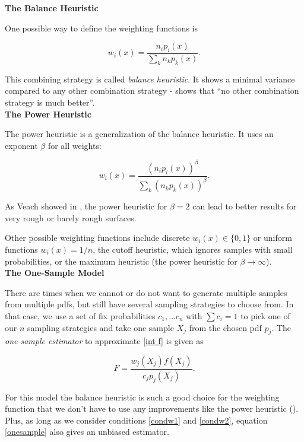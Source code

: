 \textbf{The Balance Heuristic}

One possible way to define the weighting functions is

\begin{equation}
w_i(x) = \frac{n_ip_i(x)}{\sum_k n_kp_k(x)}.
\end{equation}

This combining strategy is called \emph{balance heuristic}. It shows a minimal variance compared to any other combination strategy -  \cite[9.2.2, page 264]{veachdiss} shows that ``no other combination strategy is much better''.\\


\textbf{The Power Heuristic}

The power heuristic is a generalization of the balance heuristic. It uses an exponent $\beta$ for all weights:

\begin{equation}
\label{power heuristic}
w_i(x) = \frac{(n_ip_i(x))^\beta}{\sum_k (n_kp_k(x))^\beta}.
\end{equation}

As Veach showed in \cite[chapter 9.3.1]{veachdiss}, the power heuristic for $\beta=2$ can lead to better results for very rough or barely rough surfaces.

Other possible weighting functions include discrete $w_i(x) \in \{0,1\}$ or uniform functions $w_i(x) = 1/n$, the cutoff heuristic, which ignores samples with small probabilities, or the maximum heuristic (the power heuristic for $\beta \rightarrow \infty$).\\

\textbf{The One-Sample Model}

There are times when we cannot or do not want to generate multiple samples from multiple pdfs, but still have several sampling strategies to choose from. In that case, we use a set of fix probabilities $c_1, \dots c_n$ with $\sum c_i = 1$ to pick one of our $n$ sampling strategies and take one sample $X_j$ from the chosen pdf $p_j$. The \emph{one-sample estimator} to approximate \ref{int f} is given as

\begin{equation}
\label{onesample}
F=\frac{w_j(X_j)f(X_j)}{c_jp_j(X_j)}.
\end{equation}

For this model the balance heuristic is such a good choice for the weighting function that we don't have to use any improvements like the power heuristic (\cite[9.2.4]{veachdiss}). Plus, as long as we consider conditions \ref{condw1} and \ref{condw2}, equation \ref{onesample} also gives an unbiased estimator.

